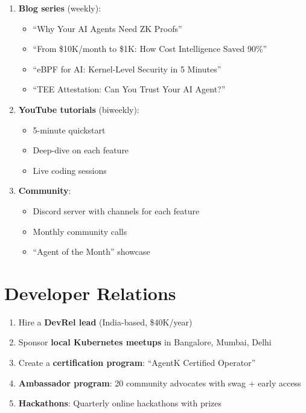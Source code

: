 \documentclass[12pt,a4paper,openany]{report}
\begin{document}
\begin{enumerate}
    \item \textbf{Blog series} (weekly):
    \begin{itemize}
        \item ``Why Your AI Agents Need ZK Proofs''
        \item ``From \$10K/month to \$1K: How Cost Intelligence Saved 90\%''
        \item ``eBPF for AI: Kernel-Level Security in 5 Minutes''
        \item ``TEE Attestation: Can You Trust Your AI Agent?''
    \end{itemize}
    \item \textbf{YouTube tutorials} (biweekly):
    \begin{itemize}
        \item 5-minute quickstart
        \item Deep-dive on each feature
        \item Live coding sessions
    \end{itemize}
    \item \textbf{Community}:
    \begin{itemize}
        \item Discord server with channels for each feature
        \item Monthly community calls
        \item ``Agent of the Month'' showcase
    \end{itemize}
\end{enumerate}

\section{Developer Relations}

\begin{enumerate}
    \item Hire a \textbf{DevRel lead} (India-based, \$40K/year)
    \item Sponsor \textbf{local Kubernetes meetups} in Bangalore, Mumbai, Delhi
    \item Create a \textbf{certification program}: ``AgentK Certified Operator''
    \item \textbf{Ambassador program}: 20 community advocates with swag + early access
    \item \textbf{Hackathons}: Quarterly online hackathons with prizes
\end{enumerate}
\end{document}
